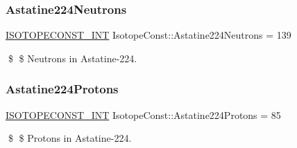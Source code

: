 \subsubsection{\texorpdfstring{Astatine224\+Neutrons}{Astatine224Neutrons}}
{\footnotesize\ttfamily \mbox{\hyperlink{group___isotope_const-_macros_ga5f18360b3e99483a35c32d789e62621c}{I\+S\+O\+T\+O\+P\+E\+C\+O\+N\+S\+T\+\_\+\+I\+NT}} Isotope\+Const\+::\+Astatine224\+Neutrons = 139}

\$ \$ Neutrons in Astatine-\/224. \mbox{\label{group___isotope_const-_astatine-_at224_ga258ffdb50d63d3e58e8278f43869aa1e}} 
\subsubsection{\texorpdfstring{Astatine224\+Protons}{Astatine224Protons}}
{\footnotesize\ttfamily \mbox{\hyperlink{group___isotope_const-_macros_ga5f18360b3e99483a35c32d789e62621c}{I\+S\+O\+T\+O\+P\+E\+C\+O\+N\+S\+T\+\_\+\+I\+NT}} Isotope\+Const\+::\+Astatine224\+Protons = 85}

\$ \$ Protons in Astatine-\/224. 